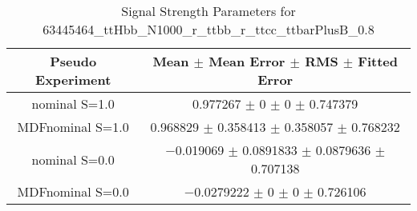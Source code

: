 \begin{table}
\centering
\caption{Signal Strength Parameters for 63445464\_ttHbb\_N1000\_r\_ttbb\_r\_ttcc\_ttbarPlusB\_0.8}
\begin{tabular}{cc}
\toprule
Pseudo Experiment & Mean $\pm$ Mean Error $\pm$ RMS $\pm$ Fitted Error\\
\midrule
nominal S=1.0 & \num{0.977267} $\pm$ \num{0} $\pm$ \num{0} $\pm$ \num{0.747379}\\
MDFnominal S=1.0 & \num{0.968829} $\pm$ \num{0.358413} $\pm$ \num{0.358057} $\pm$ \num{0.768232}\\
nominal S=0.0 & \num{-0.019069} $\pm$ \num{0.0891833} $\pm$ \num{0.0879636} $\pm$ \num{0.707138}\\
MDFnominal S=0.0 & \num{-0.0279222} $\pm$ \num{0} $\pm$ \num{0} $\pm$ \num{0.726106}\\
\bottomrule
\end{tabular}
\end{table}